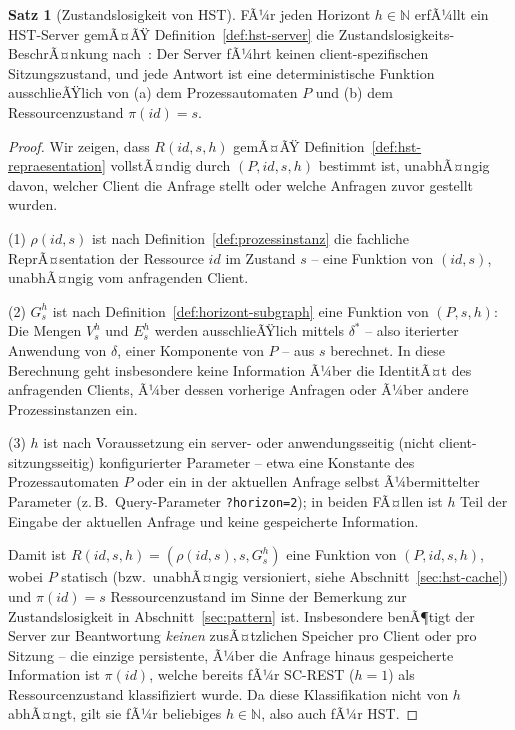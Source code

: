 ﻿\documentclass[a4paper,12pt]{article}
\theoremstyle{definition}
\newtheorem{satz}{Satz}
\begin{document}
\begin{satz}[Zustandslosigkeit von HST]
	\label{satz:hst-zustandslosigkeit}
	FÃ¼r jeden Horizont $h\in\mathbb{N}$ erfÃ¼llt ein HST-Server gemÃ¤ÃŸ
	Definition~\ref{def:hst-server} die Zustandslosigkeits-BeschrÃ¤nkung
	nach~\cite{fielding2000}: Der Server fÃ¼hrt keinen client-spezifischen
	Sitzungszustand, und jede Antwort ist eine deterministische Funktion ausschlieÃŸlich
	von (a) dem Prozessautomaten $P$ und (b) dem Ressourcenzustand $\pi(id)=s$.
\end{satz}

\begin{proof}
	Wir zeigen, dass $R(id,s,h)$ gemÃ¤ÃŸ Definition~\ref{def:hst-repraesentation}
	vollstÃ¤ndig durch $(P,id,s,h)$ bestimmt ist, unabhÃ¤ngig davon, welcher Client die
	Anfrage stellt oder welche Anfragen zuvor gestellt wurden.

	(1) $\rho(id,s)$ ist nach Definition~\ref{def:prozessinstanz} die fachliche
	ReprÃ¤sentation der Ressource $id$ im Zustand $s$ -- eine Funktion von $(id,s)$,
	unabhÃ¤ngig vom anfragenden Client.

	(2) $G_s^h$ ist nach Definition~\ref{def:horizont-subgraph} eine Funktion von
	$(P,s,h)$: Die Mengen $V_s^h$ und $E_s^h$ werden ausschlieÃŸlich mittels
	$\delta^{*}$ -- also iterierter Anwendung von $\delta$, einer Komponente von $P$ --
	aus $s$ berechnet. In diese Berechnung geht insbesondere keine Information Ã¼ber die
	IdentitÃ¤t des anfragenden Clients, Ã¼ber dessen vorherige Anfragen oder Ã¼ber andere
	Prozessinstanzen ein.

	(3) $h$ ist nach Voraussetzung ein server- oder anwendungsseitig (nicht
	client-sitzungsseitig) konfigurierter Parameter -- etwa eine Konstante des
	Prozessautomaten $P$ oder ein in der aktuellen Anfrage selbst Ã¼bermittelter Parameter
	(z.\,B.\ Query-Parameter \texttt{?horizon=2}); in beiden FÃ¤llen ist $h$ Teil der
	Eingabe der aktuellen Anfrage und keine gespeicherte Information.

	Damit ist $R(id,s,h)=(\rho(id,s),s,G_s^h)$ eine Funktion von $(P,id,s,h)$, wobei $P$
	statisch (bzw.\ unabhÃ¤ngig versioniert, siehe Abschnitt~\ref{sec:hst-cache}) und
	$\pi(id)=s$ Ressourcenzustand im Sinne der Bemerkung zur Zustandslosigkeit in
	Abschnitt~\ref{sec:pattern} ist. Insbesondere benÃ¶tigt der Server zur Beantwortung
	\emph{keinen} zusÃ¤tzlichen Speicher pro Client oder pro Sitzung -- die einzige
	persistente, Ã¼ber die Anfrage hinaus gespeicherte Information ist $\pi(id)$, welche
	bereits fÃ¼r SC-REST ($h=1$) als Ressourcenzustand klassifiziert wurde. Da diese
	Klassifikation nicht von $h$ abhÃ¤ngt, gilt sie fÃ¼r beliebiges $h\in\mathbb{N}$, also
	auch fÃ¼r HST. \qedhere
\end{proof}
\end{document}
